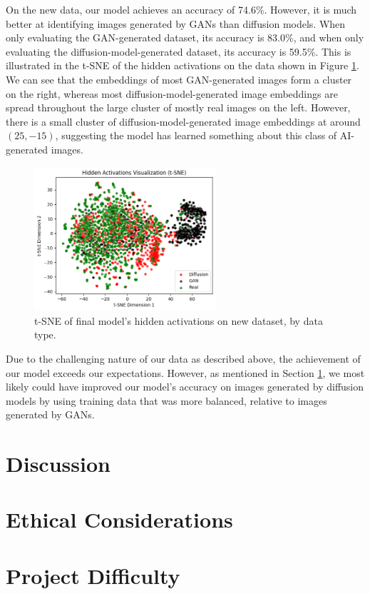 \documentclass{article} %
\begin{document}
On the new data, our model achieves an accuracy of 74.6\%. However, it is much better at identifying images generated by GANs than diffusion models. When only evaluating the GAN-generated dataset, its accuracy is 83.0\%, and when only evaluating the diffusion-model-generated dataset, its accuracy is 59.5\%. This is illustrated in the t-SNE of the hidden activations on the data shown in Figure \ref{fig:new_data_tsne}. We can see that the embeddings of most GAN-generated images form a cluster on the right, whereas most diffusion-model-generated image embeddings are spread throughout the large cluster of mostly real images on the left. However, there is a small cluster of diffusion-model-generated image embeddings at around $(25, -15)$, suggesting the model has learned something about this class of AI-generated images.

\begin{figure}[h]
    \begin{center}
        \includegraphics[width=0.6\textwidth]{figs/tsne.png}
    \end{center}
    \caption{t-SNE of final model's hidden activations on new dataset, by data type.}
    \label{fig:new_data_tsne}
\end{figure}

Due to the challenging nature of our data as described above, the achievement of our model exceeds our expectations. However, as mentioned in Section \ref{discussion}, we most likely could have improved our model's accuracy on images generated by diffusion models by using training data that was more balanced, relative to images generated by GANs.

\section{Discussion}
\label{discussion}


\section{Ethical Considerations}



\section{Project Difficulty}



\label{last_page}



\end{document}

